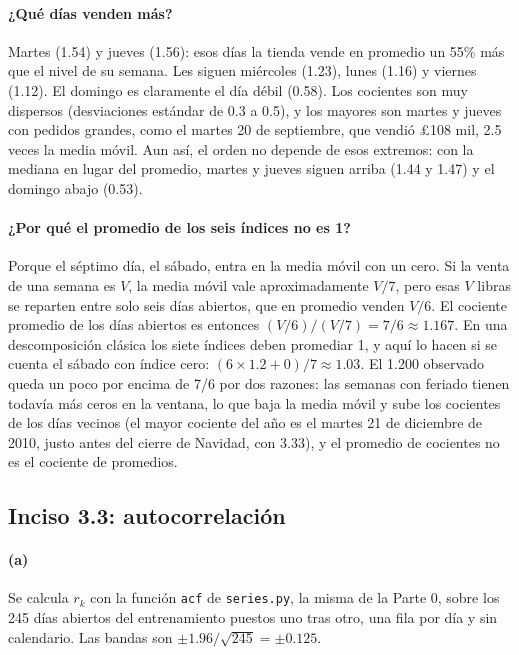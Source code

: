 \paragraph{¿Qué días venden más?} Martes (1.54) y jueves (1.56): esos días la
tienda vende en promedio un 55\% más que el nivel de su semana. Les siguen
miércoles (1.23), lunes (1.16) y viernes (1.12). El domingo es claramente el
día débil (0.58). Los cocientes son muy dispersos (desviaciones estándar de
0.3 a 0.5), y los mayores son martes y jueves con pedidos grandes, como el
martes 20 de septiembre, que vendió \pounds108 mil, 2.5 veces la media móvil.
Aun así, el orden no depende de esos extremos: con la mediana en lugar del
promedio, martes y jueves siguen arriba (1.44 y 1.47) y el domingo abajo
(0.53).

\paragraph{¿Por qué el promedio de los seis índices no es 1?} Porque el
séptimo día, el sábado, entra en la media móvil con un cero. Si la venta de
una semana es $V$, la media móvil vale aproximadamente $V/7$, pero esas $V$
libras se reparten entre solo seis días abiertos, que en promedio venden
$V/6$. El cociente promedio de los días abiertos es entonces
$(V/6)/(V/7) = 7/6\approx1.167$. En una descomposición clásica los siete
índices deben promediar 1, y aquí lo hacen si se cuenta el sábado con índice
cero: $(6\times1.2 + 0)/7 \approx 1.03$. El 1.200 observado queda un poco por
encima de 7/6 por dos razones: las semanas con feriado tienen todavía más
ceros en la ventana, lo que baja la media móvil y sube los cocientes de los
días vecinos (el mayor cociente del año es el martes 21 de diciembre de 2010,
justo antes del cierre de Navidad, con 3.33), y el promedio de cocientes no es
el cociente de promedios.

\subsection{Inciso 3.3: autocorrelación}

\paragraph{(a)} Se calcula $r_k$ con la función \texttt{acf} de
\texttt{series.py}, la misma de la Parte 0, sobre los 245 días abiertos del
entrenamiento puestos uno tras otro, una fila por día y sin calendario. Las
bandas son $\pm1.96/\sqrt{245}=\pm0.125$.

